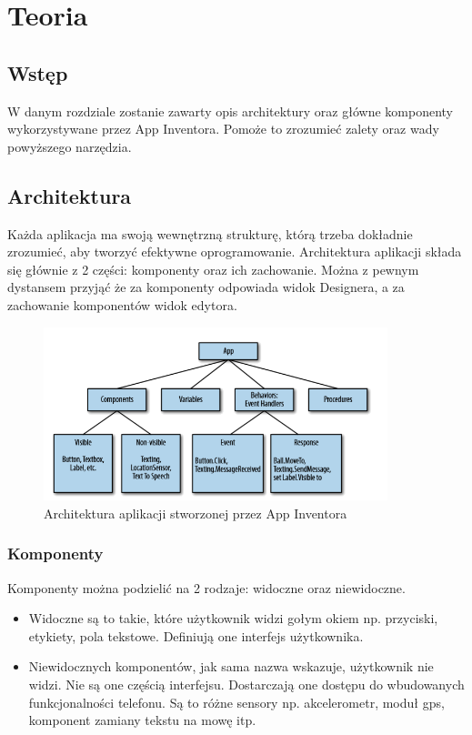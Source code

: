 \chapter{Teoria}
\label{c3}

\section{Wstęp}
\label{c31}

W danym rozdziale zostanie zawarty opis architektury oraz główne komponenty wykorzystywane przez App Inventora. Pomoże to zrozumieć zalety oraz wady powyższego narzędzia.

\section{Architektura}
\label{c32}

Każda aplikacja ma swoją wewnętrzną strukturę, którą trzeba dokładnie zrozumieć, aby tworzyć efektywne oprogramowanie. Architektura aplikacji składa się głównie z 2 części: komponenty oraz ich zachowanie. Można z pewnym dystansem przyjąć że za komponenty odpowiada widok Designera, a za zachowanie komponentów widok edytora.

\begin{figure}[th] 
\centering\includegraphics[width=10cm]{figures/architektura}
\caption{Architektura aplikacji stworzonej przez App Inventora\cite{appinventor:architektura}}
\end{figure}

\subsection{Komponenty}
\label{c321}

Komponenty można podzielić na 2 rodzaje: widoczne oraz niewidoczne. 
\begin{itemize}
\item Widoczne są to takie, które użytkownik widzi gołym okiem np. przyciski, etykiety, pola tekstowe. Definiują one interfejs użytkownika.
\item Niewidocznych komponentów, jak sama nazwa wskazuje, użytkownik nie widzi. Nie są one częścią interfejsu. Dostarczają one dostępu do wbudowanych funkcjonalności telefonu. Są to różne sensory np. akcelerometr, moduł gps, komponent zamiany tekstu na mowę itp.
\end{itemize}

